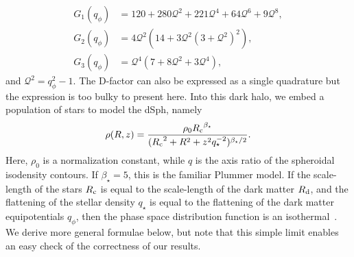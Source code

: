 \documentclass[prd,twocolumn,showpacs,preprintnumbers,superscriptaddress,nofootinbib,amsmath,amssymb,nobalancelastpage]{revtex4}
\def\Rd{{R_{\rm d}}}
\def\Rc{{R_{\rm c}}}
\begin{document}
\begin{equation}
\begin{split}
G_1(q_\phi)&=120 + 280 \mathcal{Q}^2 + 221 \mathcal{Q}^4 + 64 \mathcal{Q}^6 + 9 \mathcal{Q}^8,\\
G_2(q_\phi)&=4 \mathcal{Q}^2 (14 + 3 \mathcal{Q}^2 (3 + \mathcal{Q}^2)^2),\\
G_3(q_\phi)&=\mathcal{Q}^4 (7 + 8 \mathcal{Q}^2 + 3 \mathcal{Q}^4),
\end{split}
\end{equation}
and $\mathcal{Q}^2=q_\phi^2-1$.
The D-factor can also be expressed as a single quadrature but the expression is too bulky to present here.
Into this dark halo, we embed a population of stars to model the dSph, namely
%
\[
\rho(R,z) = {\rho_0 \Rc^{\beta_\star} \over (\Rc^2 + R^2 + z^2q_\star^{-2})^{\beta_\star/2}}.
\]
%
Here, $\rho_0$ is a normalization constant, while $q$ is the axis
ratio of the spheroidal isodensity contours. If $\beta_\star=5$, this is the
familiar Plummer model.  If the scale-length of the stars $\Rc$ is equal
to the scale-length of the dark matter $\Rd$, and the flattening of the
stellar density $q_\star$ is equal to the flattening of the dark matter
equipotentials $q_\phi$, then the phase space distribution function
is an isothermal~\citep{Ev93}. We derive more general formulae below,
but note that this simple limit enables an easy check of the
correctness of our results.
\end{document}
